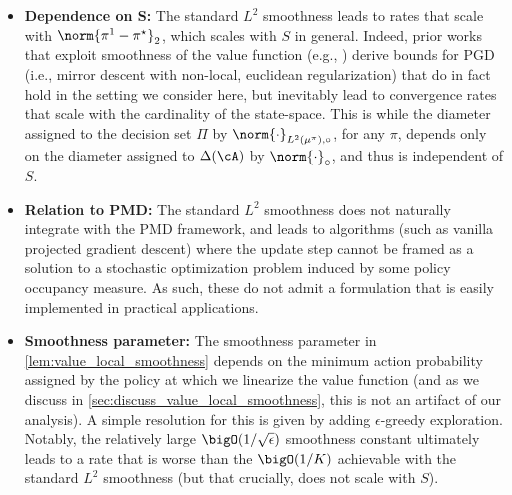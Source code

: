 \begin{itemize}
    \item \textbf{Dependence on $\boldsymbol S$:} The standard $L^2$ smoothness leads to rates that scale with $\norm{\pi^1 - \pi^\star}_2$, which scales with $S$ in general.  Indeed, prior works that exploit smoothness of the value function (e.g., \citealp{agarwal2021theory,xiao2022convergence}) derive bounds for PGD (i.e., mirror descent with non-local, euclidean regularization) that do in fact hold in the  setting we consider here, but inevitably lead to convergence rates that scale with the cardinality of the state-space. This is while the diameter assigned to the decision set $\Pi$ by $\norm{\cdot}_{L^2(\mu^\pi), \circ}$, for any $\pi$, depends only on the diameter assigned to $\Delta(\cA)$ by $\norm{\cdot}_\circ$, and thus is independent of $S$.
    \item \textbf{Relation to PMD:} The standard $L^2$ smoothness does not naturally integrate with the PMD framework, and leads to algorithms (such as vanilla projected gradient descent) where the update step cannot be framed as a solution to a stochastic optimization problem induced by some policy occupancy measure. As such, these do not admit a formulation that is easily implemented in practical applications.
    \item \textbf{Smoothness parameter:} The smoothness parameter in \cref{lem:value_local_smoothness} depends on the minimum action probability assigned by the policy at which we linearize the value function (and as we discuss in \cref{sec:discuss_value_local_smoothness}, this is not an artifact of our analysis). A simple resolution for this is given by adding $\epsilon$-greedy exploration. Notably, the relatively large $\bigO(1/\sqrt\epsilon)$ smoothness constant ultimately leads to a rate that is worse than the $\bigO(1/K)$ achievable with the standard $L^2$ smoothness (but that crucially, does not scale with $S$).
\end{itemize}


